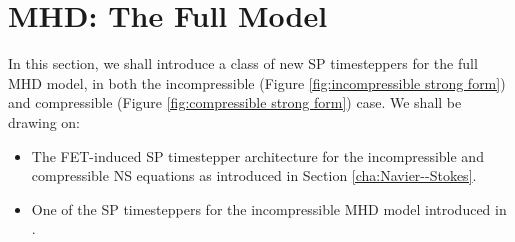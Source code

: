 \section{MHD: The Full Model}
    In this section, we shall introduce a class of new SP timesteppers for the full MHD model, in both the incompressible (Figure \ref{fig:incompressible strong form}) and compressible (Figure \ref{fig:compressible strong form}) case. We shall be drawing on:
    \begin{itemize}
        \item  The FET-induced SP timestepper architecture for the incompressible and compressible NS equations as introduced in Section \ref{cha:Navier--Stokes}.
        \item  One of the SP timesteppers for the incompressible MHD model introduced in \cite{Laakmann_Hu_Farrell_2022}.
    \end{itemize}


    
    
